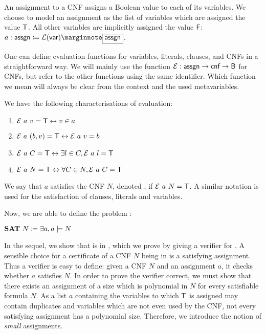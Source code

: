 An assignment to a CNF assigns a Boolean value to each of its variables. We choose to model an assignment as the list of variables which are assigned the value $\mathsf{T}$. All other variables are implicitly assigned the value $\mathsf{F}$:
$a : \assgn \defeq \listsof{\bvar}\mnote{\assgn}$.

One can define evaluation functions \mnotec{$\eval$} for variables, literals, clauses, and CNFs in a straightforward way. 
We will mainly use the function $\mathcal{E} : \textsf{assgn} \rightarrow \textsf{cnf} \rightarrow \textsf{B}$ for CNFs, but refer to the other functions using the same identifier. 
Which function we mean will always be clear from the context and the used metavariables. 

We have the following characterisations of evaluation:
\begin{lemma}\label{lem:cnf_eval_equiv}\leavevmode
  \begin{enumerate}
    \item $\mathcal{E}~a~v = \mathsf{T} \leftrightarrow v \in a$
    \item $\mathcal{E}~a~(b, v) = \mathsf{T} \leftrightarrow \mathcal{E}~a~v = b$
    \item $\mathcal{E}~a~C = \mathsf{T} \leftrightarrow \exists l \in C, \mathcal{E}~a~l = \mathsf{T}$
    \item $\mathcal{E}~a~N = \mathsf{T} \leftrightarrow \forall C \in N, \mathcal{E}~a~C = \mathsf{T}$
  \end{enumerate}
\end{lemma}

We say that $a$ satisfies the CNF $N$, denoted , if $\mathcal{E}~a~N = \mathsf{T}$. 
A similar notation is used for the satisfaction of clauses, literals and variables.

Now, we are able to define the problem \SAT{}:
\begin{definition}
  $\textbf{SAT}{}~N \coloneqq \exists a, a \models N$
\end{definition}

In the sequel, we show that \SAT{} is in \NP{}, which we prove by giving a verifier for \SAT{}. A sensible choice for a certificate of a CNF $N$ being in \SAT{} is a satisfying assignment. Thus a verifier is easy to define: given a CNF $N$ and an assignment $a$, it checks whether $a$ satisfies $N$.
In order to prove the verifier correct, we must show that there exists an assignment of a size which is polynomial in $N$ for every satisfiable formula $N$.
As a list $a$ containing the variables to which $\mathsf{T}$ is assigned may contain duplicates and variables which are not even used by the CNF, not every satisfying assignment has a polynomial size.
Therefore, we introduce the notion of \emph{small} assignments. 

